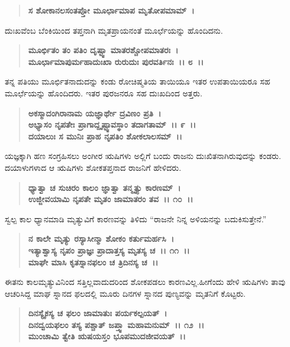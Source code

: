 \begin{verse}
\textbf{ಸ ಶೋಕಾನಲಸಂತಪ್ತೋ ಮೂರ್ಛಾಮಾಪ ಮೃತೋಪಮಾಮ್~।}
\end{verse}

ದುಃಖವೆಂಬ ಬೆಂಕಿಯಿಂದ ತಪ್ತನಾಗಿ ಮೃತಪ್ರಾಯನಂತೆ ಮೂರ್ಛೆಯನ್ನು ಹೊಂದಿದನು.

\begin{verse}
\textbf{ಮೂರ್ಛಿತಂ ತಂ ಪತಿಂ ದೃಷ್ಟ್ವಾ ಮಾತರಶ್ಚೋಪಮಾತರಃ~।}\\\textbf{ಮೂರ್ಛಾಮಾಪುರ್ಮಹಾದುಃಖಾ ರುರುದುಃ ಪುರವರ್ತಿನಃ~।। ೮~।।}
\end{verse}

ತನ್ನ ಪತಿಯು ಮೂರ್ಛಿತನಾದುದನ್ನು ಕಂಡು ರೋಚಿಷ್ಮತಿಯ ತಾಯಿಯೂ ಇತರ ಉಪತಾಯಿಯರೂ ಸಹ ಮೂರ್ಛೆಯನ್ನು ಹೊಂದಿದರು. ಇತರ ಪುರಜನರೂ ಸಹ ದುಃಖದಿಂದ ಅತ್ತರು.

\begin{verse}
\textbf{ಅಕಸ್ಮಾದಂಗಿರಾನಾಮ ಯಜ್ಞಾರ್ಥೇ ದ್ರವಿಣಂ ಪ್ರತಿ~।}\\\textbf{ಅಭ್ಯಾಸಂ ನೃಪತೇಃ ಪ್ರಾಗಾದ್ದೃಷ್ಟ್ವಾವಸ್ಥಾಂ ತದಾಗತಾಮ್~।। ೯~।। }\\\textbf{ದಯಾಲುಃ ಸ ಮುನಿಃ ಪ್ರಾಹ ನೃಪತಿಂ ಶೋಕಲಾಲಸಮ್~।।}
\end{verse}

ಯಜ್ಞಕ್ಕಾಗಿ ಹಣ ಸಂಗ್ರಹಿಸಲು ಅಂಗೀರ ಋಷಿಗಳು ಅಲ್ಲಿಗೆ ಬಂದು ರಾಜನು ದುಃಖಿತನಾಗಿರುವುದನ್ನು ಕಂಡರು. ದಯಾಳುಗಳಾದ ಆ ಋಷಿಗಳು ಶೋಕತಪ್ತನಾದ ರಾಜನಿಗೆ ಹೇಳಿದರು.

\begin{verse}
\textbf{ಧ್ಯಾತ್ವಾ ಚ ಸುಚಿರಂ ಕಾಲಂ ಜ್ಞಾತ್ವಾ ತನ್ಮೃತ್ಯು ಕಾರಣಮ್~।}\\\textbf{ಉಜ್ಜೀವಯಾಮಿ ನೃಪತೇ ಮೃತಂ ಜಾಮಾತರಂ ತವ~।। ೧೦~।।}
\end{verse}

ಸ್ವಲ್ಪ ಕಾಲ ಧ್ಯಾನಮಾಡಿ ಮೃತ್ಯುವಿಗೆ ಕಾರಣವನ್ನು ತಿಳಿದು “ರಾಜನೇ ನಿನ್ನ ಅಳಿಯನನ್ನು ಬದುಕಿಸುತ್ತೇನೆ.”

\begin{verse}
\textbf{ನ ಕಾಲೇ ಮೃತ್ಯು ರಸ್ಯಾಸೀನ್ಮಾ ಶೋಕಂ ಕರ್ತುಮರ್ಹಸಿ~।}\\\textbf{ಇತ್ಯಾಶ್ವಾಸ್ಯ ನೃಪಂ ಪ್ರಾಜ್ಞಃ ಪ್ರಾದಾತ್ತಸ್ಯ ಮೃತಸ್ಯ ಚ~।। ೧೧~।। }\\\textbf{ಮಾಘೇ ಮಾಸಿ ಕೃತಸ್ನಾನಫಲಂ ಚ ತ್ರಿದಿನಸ್ಯ ಚ~।।}
\end{verse}

ಈತನು ಕಾಲಮೃತ್ಯುವಿನಿಂದ ಸತ್ತಿಲ್ಲವಾದುದರಿಂದ ಶೋಕಪಡಲು ಕಾರಣವಿಲ್ಲ.\break ಹೀಗೆಂದು ಹೇಳಿ ಋಷಿಗಳು ತಾವು ಆಚರಿಸಿದ್ದ ಮಾಘ ಸ್ನಾನದ ಫಲದಲ್ಲಿ ಮೂರು ದಿನಗಳ ಸ್ನಾನದ ಪುಣ್ಯವನ್ನು ಮೃತನಿಗೆ ಕೊಟ್ಟರು.

\begin{verse}
\textbf{ದಿನಸ್ಯೈಕಸ್ಯ ಚ ಫಲಂ ಜಾಮಾತುಃ ಪರ್ಯಕಲ್ಪಯತ್~।}\\\textbf{ದಿನದ್ವಯಫಲಂ ತಸ್ಯ ಪಶ್ಚಾತ್ ಜಪ್ತ್ವಾ ಮಹಾಮನುಮ್~।। ೧೨~।। }\\\textbf{ಮುಂಚಾಮಿ ತ್ವೇತಿ ಋಷಯಸ್ತಂ ಭೂಪಮುದಜೀವಯತ್~।।}
\end{verse}

